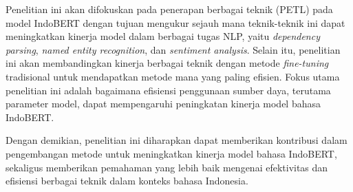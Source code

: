Penelitian ini akan difokuskan pada penerapan berbagai teknik \PETL (PETL) pada model IndoBERT dengan tujuan mengukur sejauh mana teknik-teknik ini dapat meningkatkan kinerja model dalam berbagai tugas NLP, yaitu \textit{dependency parsing}, \textit{named entity recognition}, dan \textit{sentiment analysis}. Selain itu, penelitian ini akan membandingkan kinerja berbagai teknik \PETL dengan metode \textit{fine-tuning} tradisional untuk mendapatkan metode mana yang paling efisien. Fokus utama penelitian ini adalah bagaimana efisiensi penggunaan sumber daya, terutama parameter model, dapat mempengaruhi peningkatan kinerja model bahasa IndoBERT.

Dengan demikian, penelitian ini diharapkan dapat memberikan kontribusi dalam pengembangan metode untuk meningkatkan kinerja model bahasa IndoBERT, sekaligus memberikan pemahaman yang lebih baik mengenai efektivitas dan efisiensi berbagai teknik \PETL dalam konteks bahasa Indonesia.
